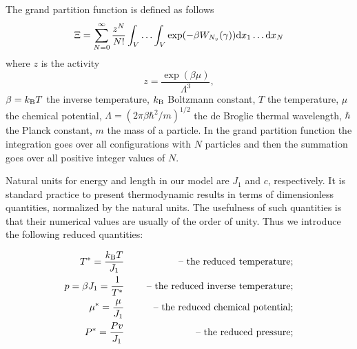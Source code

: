 The grand partition function is defined as follows
\begin{equation*}
	\Xi = \sum_{N=0}^{\infty}\frac{z^N}{N!} \int_{V} \dotsc \int_{V} \exp(-\beta W_{N_v}(\gamma)) {\rm d} x_1 \dotsc {\rm d} x_N
\end{equation*}
where $z$ is the activity
\begin{equation*}
	z = \frac{\exp(\beta \mu)}{\Lambda^3},
\end{equation*}
$\beta = k_{\rm B} T$ the inverse temperature, $k_{\rm B}$ Boltzmann constant, $T$ the temperature, $\mu$ the chemical potential, $\Lambda = (2\pi\beta\hbar^2/m)^{1/2}$ the de Broglie thermal wavelength, $\hbar$ the Planck constant, $m$ the mass of a particle. In the grand partition function the integration goes over all configurations with $N$ particles and then the summation goes over all positive integer values of $N$.

Natural units for energy and length in our model are $J_1$ and $c$, respectively. It is standard practice to present thermodynamic results in terms of dimensionless quantities, normalized by the natural units. The usefulness of such quantities is that their numerical values are usually of the order of unity. Thus we introduce the following reduced quantities: 

\begin{eqnarray*}
	T^* = \frac{k_{\rm B} T}{J_1} & \quad & \text{ -- the reduced temperature;} 
	\\
	p = \beta J_1 = \frac{1}{T^*} & \quad & \text{ -- the reduced inverse temperature;}
	\\
	\mu^* = \frac{\mu}{J_1} & \quad & \text{ -- the reduced chemical potential;}
	\\ 
	P^* = \frac{Pv}{J_1} & & \text{ -- the reduced pressure;}
\end{eqnarray*}

